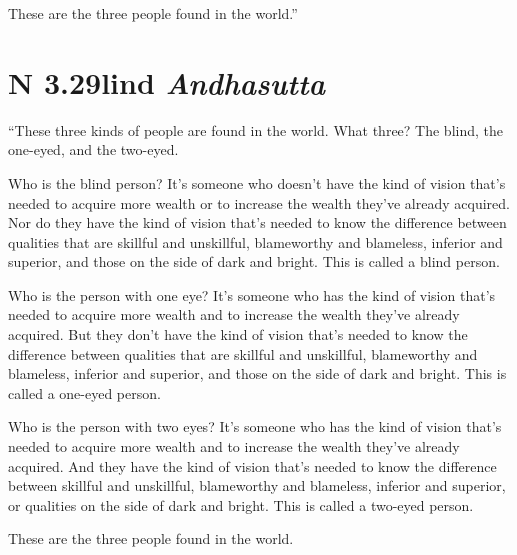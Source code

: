 \documentclass[12pt,openany]{book}%
\newcommand*{\suttatitleacronym}[1]{\smaller[2]{#1}\vspace*{.3em}}
\newcommand*{\suttatitletranslation}[1]{\linebreak{#1}}
\newcommand*{\suttatitleroot}[1]{\linebreak\smaller[2]\itshape{#1}}
\newcommand*{\tocacronym}[1]{\hspace*{-3.3em}{#1}\quad}
\newcommand*{\toctranslation}[1]{#1}
\newcommand*{\tocroot}[1]{(\textit{#1})}
\begin{document}
These are the three people found in the world.” 

%
\section*{{\suttatitleacronym AN 3.29}{\suttatitletranslation Blind }{\suttatitleroot Andhasutta}}
\addcontentsline{toc}{section}{\tocacronym{AN 3.29} \toctranslation{Blind } \tocroot{Andhasutta}}

“These three kinds of people are found in the world. What three? The blind, the one-eyed, and the two-eyed. 

Who is the blind person? It’s someone who doesn’t have the kind of vision that’s needed to acquire more wealth or to increase the wealth they’ve already acquired. Nor do they have the kind of vision that’s needed to know the difference between qualities that are skillful and unskillful, blameworthy and blameless, inferior and superior, and those on the side of dark and bright. This is called a blind person. 

Who is the person with one eye? It’s someone who has the kind of vision that’s needed to acquire more wealth and to increase the wealth they’ve already acquired. But they don’t have the kind of vision that’s needed to know the difference between qualities that are skillful and unskillful, blameworthy and blameless, inferior and superior, and those on the side of dark and bright. This is called a one-eyed person. 

Who is the person with two eyes? It’s someone who has the kind of vision that’s needed to acquire more wealth and to increase the wealth they’ve already acquired. And they have the kind of vision that’s needed to know the difference between skillful and unskillful, blameworthy and blameless, inferior and superior, or qualities on the side of dark and bright. This is called a two-eyed person. 

These are the three people found in the world. 
\end{document}
